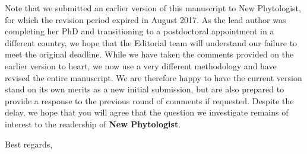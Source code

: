 \documentclass[12pt]{letter}
\begin{document}
\begin{letter}
	Note that we submitted an earlier version of this manuscript to New Phytologist, for which the revision period expired in August 2017. As the lead author was completing her PhD and transitioning to a postdoctoral appointment in a different country, we hope that the Editorial team will understand our failure to meet the original deadline. While we have taken the comments provided on the earlier version to heart, we now use a very different methodology and have revised the entire manuscript. We are therefore happy to have the current version stand on its own merits as a new initial submission, but are also prepared to provide a response to the previous round of comments if requested. Despite the delay, we hope that you will agree that the question we investigate remains of interest to the readership of \textbf{New Phytologist}.









\closing{Best regards,}


\end{letter}
\end{document}
